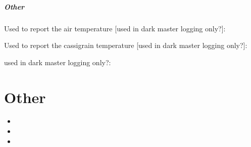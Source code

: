 \documentclass[a4paper,10pt,english]{report}
\begin{document}
\paragraph{Other}
\label{\detokenize{dev/required_input_header_keys:other}}\label{\detokenize{dev/required_input_header_keys:required-input-hkeys-other}}
Used to report the air temperature {[}used in dark master \textendash{} logging only?{]}:

\begin{sphinxVerbatim}[commandchars=\\\{\}]
                         
\end{sphinxVerbatim}

Used to report the cassigrain temperature {[}used in dark master \textendash{} logging only?{]}:

\begin{sphinxVerbatim}[commandchars=\\\{\}]
                           
\end{sphinxVerbatim}

used in dark master \textendash{} logging only?:

\begin{sphinxVerbatim}[commandchars=\\\{\}]
                        
\end{sphinxVerbatim}


\chapter{Other}
\label{\detokenize{index:other}}\label{\detokenize{index:apero-doc-main-other}}\begin{itemize}
\item {} 

\item {} 

\item {} 

\end{itemize}
\end{document}
